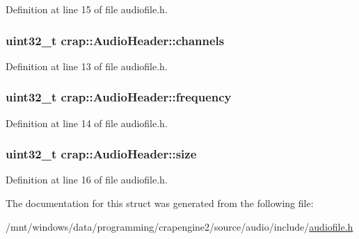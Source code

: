 Definition at line 15 of file audiofile.\+h.

\hypertarget{structcrap_1_1_audio_header_acce2baa85f0c4f92b05f0c7c5c831835}{
\subsubsection[{channels}]{\setlength{\rightskip}{0pt plus 5cm}uint32\+\_\+t crap\+::\+Audio\+Header\+::channels}}\label{structcrap_1_1_audio_header_acce2baa85f0c4f92b05f0c7c5c831835}


Definition at line 13 of file audiofile.\+h.

\hypertarget{structcrap_1_1_audio_header_a4e84b055b61332538db96e156cc13fe6}{
\subsubsection[{frequency}]{\setlength{\rightskip}{0pt plus 5cm}uint32\+\_\+t crap\+::\+Audio\+Header\+::frequency}}\label{structcrap_1_1_audio_header_a4e84b055b61332538db96e156cc13fe6}


Definition at line 14 of file audiofile.\+h.

\hypertarget{structcrap_1_1_audio_header_abb74cac78b291b8f8548566db8aa1112}{
\subsubsection[{size}]{\setlength{\rightskip}{0pt plus 5cm}uint32\+\_\+t crap\+::\+Audio\+Header\+::size}}\label{structcrap_1_1_audio_header_abb74cac78b291b8f8548566db8aa1112}


Definition at line 16 of file audiofile.\+h.



The documentation for this struct was generated from the following file\+:\begin{DoxyCompactItemize}
\item 
/mnt/windows/data/programming/crapengine2/source/audio/include/\hyperlink{audiofile_8h}{audiofile.\+h}\end{DoxyCompactItemize}
